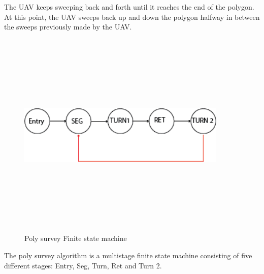 The UAV keeps sweeping back and forth until it reaches the end of the polygon. At this point, the UAV sweeps back up and down the polygon halfway in between the sweeps previously made by the UAV. 
\begin{figure}[H]
\centering
\includegraphics[width=10cm,height=10cm,keepaspectratio]{imagenes/FSM.png}
\caption{Poly survey Finite state machine }
\label{fig:FSM}
\end{figure}

The poly survey algorithm is a multistage finite state machine consisting of five different stages: Entry, Seg, Turn, Ret and Turn 2.

